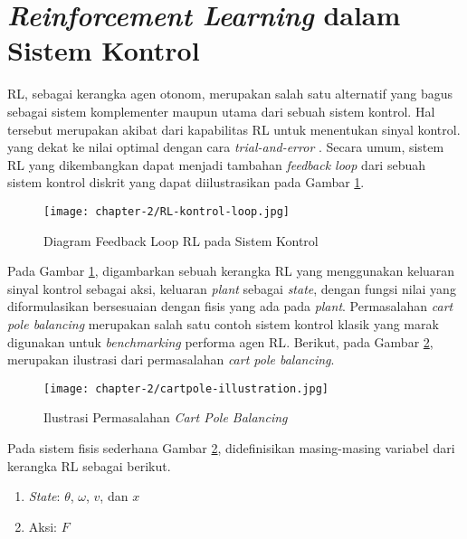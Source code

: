 \section{\textit{Reinforcement Learning} dalam Sistem Kontrol}

\ac{RL}, sebagai kerangka agen otonom, merupakan salah satu alternatif yang bagus sebagai sistem komplementer maupun utama dari sebuah sistem kontrol. Hal tersebut merupakan akibat dari kapabilitas \ac{RL} untuk menentukan sinyal kontrol. yang dekat ke nilai optimal dengan cara \textit{trial-and-error} \parencite{vichugov2005application}. Secara umum, sistem RL yang dikembangkan dapat menjadi tambahan \textit{feedback loop} dari sebuah sistem kontrol diskrit yang dapat diilustrasikan pada Gambar \ref{fig:RL-loop-kontrol}.


\begin{figure}[H]
	\centering
	\texttt{[image: chapter-2/RL-kontrol-loop.jpg]}
	\caption{Diagram Feedback Loop \ac{RL} pada Sistem Kontrol \parencite{vichugov2005application}}
	\label{fig:RL-loop-kontrol}
\end{figure}

Pada Gambar \ref{fig:RL-loop-kontrol}, digambarkan sebuah kerangka \ac{RL} yang menggunakan keluaran sinyal kontrol sebagai aksi, keluaran \textit{plant} sebagai \textit{state}, dengan fungsi nilai yang diformulasikan bersesuaian dengan fisis yang ada pada \textit{plant}. Permasalahan \textit{cart pole balancing} \parencite{nagendra2017comparison} merupakan salah satu contoh sistem kontrol klasik yang marak digunakan untuk \textit{benchmarking} performa agen \ac{RL}. Berikut, pada Gambar \ref{fig:cartpole-illustration}, merupakan ilustrasi dari permasalahan \textit{cart pole balancing}.

\begin{figure}[h]
	\centering
	\texttt{[image: chapter-2/cartpole-illustration.jpg]}
	\caption{Ilustrasi Permasalahan \textit{Cart Pole Balancing}}
	\label{fig:cartpole-illustration}
\end{figure}

Pada sistem fisis sederhana Gambar \ref{fig:cartpole-illustration}, didefinisikan masing-masing variabel dari kerangka \ac{RL} sebagai berikut.

\begin{enumerate}
	\item \textit{State}: \(\theta\), \(\omega\), \(v\), dan \(x\)
	\item Aksi: \(F\)
\end{enumerate}

